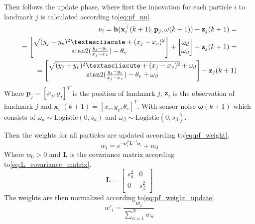 Then follows the update phase, where first the innovation for each particle $i$ to landmark $j$ is calculated according to\:\eqref{eq:pf_nu}\:\cite{corke_robotics_2023}.
\begin{equation}
    \label{eq:pf_nu}
    \begin{split}
        \mathbf{\nu}_i = \mathbf{h} (\mathbf{x}_i^+(k+1), \mathbf{p}_j, \mathbf{\omega} (k+1)) - \mathbf{z}_j (k+1) = \\
        = 
        \begin{bmatrix}
            \sqrt{(y_j - y_v)^2 ´+ (x_j - x_v)^2}\\
            \atantwo(\frac{y_j-y_v}{x_j-x_v}) - \theta_v
        \end{bmatrix}
        +
        \begin{bmatrix}
            \omega_d \\
            \omega_{\beta}
        \end{bmatrix}
        - \mathbf{z}_j (k+1)
        = \\
        =
        \begin{bmatrix}
            \sqrt{(y_j - y_v)^2 ´+ (x_j - x_v)^2} + \omega_d \\
            \atantwo(\frac{y_j-y_v}{x_j-x_v}) - \theta_v + \omega_{\beta}
        \end{bmatrix}
        - \mathbf{z}_j (k+1)
    \end{split}
\end{equation}
Where $\mathbf{p}_j = [x_j, y_j]^T$ is the position of landmark $j$, $\mathbf{z}_j$ is the observation of landmark $j$ and $\mathbf{x}_i^+(k+1) = [x_v, y_v, \theta_v]^T$\:\cite{corke_robotics_2023}. With sensor noise $\mathbf{\omega} (k+1)$ which consists of $\omega_d \sim \text{Logistic} (0,s_d)$ and $\omega_{\beta} \sim \text{Logistic} (0, s_{\beta})$.

Then the weights for all particles are updated according to\:\eqref{eq:pf_weight}\:\cite{corke_robotics_2023}.
\begin{equation}
    \label{eq:pf_weight}
    w_i = e^{-\mathbf{\nu}_i^T \mathbf{L}^{-1} \mathbf{\nu}_i} + w_0
\end{equation}
Where $w_0 > 0$ and $\mathbf{L}$ is the covariance matrix according to\:\eqref{eq:L_covariance_matrix}\:\cite{corke_robotics_2023}.
\begin{equation}
    \label{eq:L_covariance_matrix}
    \mathbf{L} = 
    \begin{bmatrix}
        s_d^2 & 0           \\
        0     & s_{\beta}^2
    \end{bmatrix}
\end{equation}
The weights are then normalized according to\:\eqref{eq:pf_weight_update}\:\cite{corke_robotics_2023}.
\begin{equation}
    \label{eq:pf_weight_update}
    w'_i = \frac{w_i}{\sum_{n = 1}^N w_n}
\end{equation}

